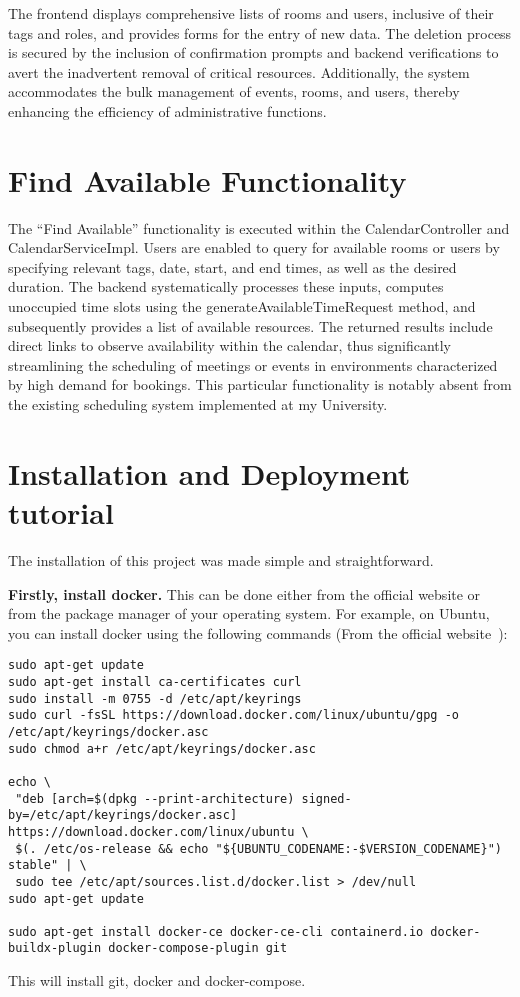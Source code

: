 The frontend displays comprehensive lists of rooms and users, inclusive of their tags and roles, and provides forms for the entry of new data.
The deletion process is secured by the inclusion of confirmation prompts and backend verifications to avert the inadvertent removal of critical resources.
Additionally, the system accommodates the bulk management of events, rooms, and users, thereby enhancing the efficiency of administrative functions.


\section{Find Available Functionality}\label{sec:findAvailableFunctionality}
The ``Find Available'' functionality is executed within the CalendarController and CalendarServiceImpl.
Users are enabled to query for available rooms or users by specifying relevant tags, date, start, and end times, as well as the desired duration.
The backend systematically processes these inputs, computes unoccupied time slots using the generateAvailableTimeRequest method, and subsequently provides a list of available resources.
The returned results include direct links to observe availability within the calendar, thus significantly streamlining the scheduling of meetings or events in environments characterized by high demand for bookings.
This particular functionality is notably absent from the existing scheduling system implemented at my University.

\newpage
\section{Installation and Deployment tutorial}\label{sec:installationAndDeploymentTutorial}
The installation of this project was made simple and straightforward.

\textbf{Firstly, install docker.} This can be done either from the official website or from the package manager of your operating system.
For example, on Ubuntu, you can install docker using the following commands (From the official website~\cite{DockerWebsite}):
\begin{verbatim}
sudo apt-get update
sudo apt-get install ca-certificates curl
sudo install -m 0755 -d /etc/apt/keyrings
sudo curl -fsSL https://download.docker.com/linux/ubuntu/gpg -o /etc/apt/keyrings/docker.asc
sudo chmod a+r /etc/apt/keyrings/docker.asc

echo \
 "deb [arch=$(dpkg --print-architecture) signed-by=/etc/apt/keyrings/docker.asc] https://download.docker.com/linux/ubuntu \
 $(. /etc/os-release && echo "${UBUNTU_CODENAME:-$VERSION_CODENAME}") stable" | \
 sudo tee /etc/apt/sources.list.d/docker.list > /dev/null
sudo apt-get update

sudo apt-get install docker-ce docker-ce-cli containerd.io docker-buildx-plugin docker-compose-plugin git
\end{verbatim}
This will install git, docker and docker-compose.

